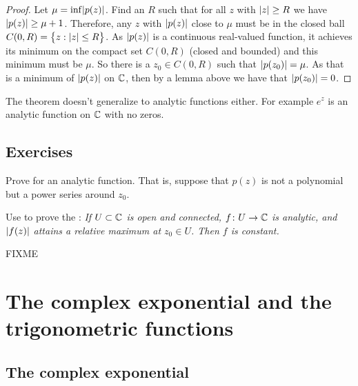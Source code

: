 \begin{proof}
Let $\mu = \inf \lvert {p(z)} \rvert$.  Find an $R$ such that
for all $z$ with $\lvert {z} \rvert \geq R$ we have $\lvert {p(z)} \rvert \geq \mu+1$.
Therefore, any $z$ with $\lvert {p(z)} \rvert$ close to $\mu$ must be in the
closed ball $C(0,R) = \bigl\{ z : \lvert {z} \rvert \leq R \bigr\}$.  As $\lvert {p(z)} \rvert$
is a continuous real-valued function, it achieves its minimum
on the compact set $C(0,R)$ (closed and bounded) and this minimum must
be $\mu$.  So there is a $z_0 \in C(0,R)$ such that $\lvert {p(z_0)} \rvert = \mu$.
As that is a minimum of $\lvert {p(z)} \rvert$ on ${\mathbb{C}}$, then by a lemma above we have
that $\lvert {p(z_0)} \rvert = 0$.
\end{proof}

The theorem doesn't generalize to analytic functions either.  For example
$e^{z}$ is an analytic function on ${\mathbb{C}}$ with no zeros.

\subsection{Exercises}

\begin{exercise} \label{exercise:minprinciple}
Prove  for an analytic function.  That
is, suppose that $p(z)$ is not a polynomial but a power series around $z_0$.
\end{exercise}

\begin{exercise}
Use  to prove the \emph{}: \emph{If $U \subset {\mathbb{C}}$ is open and connected,
$f \colon U \to {\mathbb{C}}$ is analytic, and $\lvert {f(z)} \rvert$ attains a relative
maximum at $z_0 \in U$.  Then $f$ is constant.}
\end{exercise}

FIXME


\sectionnewpage
\section{The complex exponential and the trigonometric functions}
\label{sec:FIXME}


\subsection{The complex exponential}

